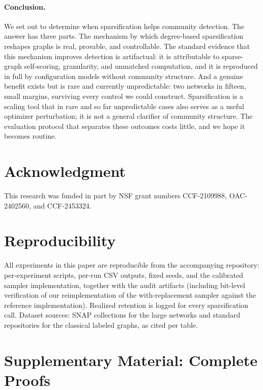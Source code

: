 \documentclass[10pt,journal,compsoc]{IEEEtran}
\begin{document}
\paragraph{Conclusion.}
We set out to determine when sparsification helps community detection.
The answer has three parts.
The mechanism by which degree-based sparsification reshapes graphs is real, provable, and controllable.
The standard evidence that this mechanism improves detection is artifactual: it is attributable to sparse-graph self-scoring, granularity, and unmatched computation, and it is reproduced in full by configuration models without community structure.
And a genuine benefit exists but is rare and currently unpredictable: two networks in fifteen, small margins, surviving every control we could construct.
Sparsification is a scaling tool that in rare and so far unpredictable cases also serves as a useful optimizer perturbation; it is not a general clarifier of community structure.
The evaluation protocol that separates these outcomes costs little, and we hope it becomes routine.

\section*{Acknowledgment}

This research was funded in part by NSF grant numbers CCF-2109988, OAC-2402560, and CCF-2453324.

\appendix

\section*{Reproducibility}
All experiments in this paper are reproducible from the accompanying repository: per-experiment scripts, per-run CSV outputs, fixed seeds, and the calibrated sampler implementation, together with the audit artifacts (including bit-level verification of our reimplementation of the with-replacement sampler against the reference implementation).
Realized retention is logged for every sparsification call.
Dataset sources: SNAP collections for the large networks and standard repositories for the classical labeled graphs, as cited per table.





\clearpage
\section*{Supplementary Material: Complete Proofs}
\label{app:proofs}
\end{document}
